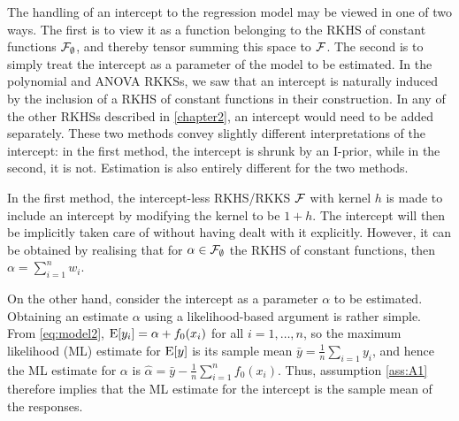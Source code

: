 The handling of an intercept to the regression model may be viewed in one of two ways.
The first is to view it as a function belonging to the RKHS of constant functions ${\mathcal F}_\emptyset$, and thereby tensor summing this space to ${\mathcal F}$.
The second is to simply treat the intercept as a parameter of the model to be estimated.
In the polynomial and ANOVA RKKSs, we saw that an intercept is naturally induced by the inclusion of a RKHS of constant functions in their construction.
In any of the other RKHSs described in \cref{chapter2}, an intercept would need to be added separately.
These two methods convey slightly different interpretations of the intercept: in the first method, the intercept is shrunk by an I-prior, while in the second, it is not.
Estimation is also entirely different for the two methods.

In the first method, the intercept-less RKHS/RKKS ${\mathcal F}$ with kernel $h$ is made to include an intercept by modifying the kernel to be $1 + h$.
The intercept will then be implicitly taken care of without having dealt with it explicitly.
However, it can be obtained by realising that for $\alpha\in{\mathcal F}_\emptyset$ the RKHS of constant functions, then $\alpha = \sum_{i=1}^n w_i$.

On the other hand, consider the intercept as a parameter $\alpha$ to be estimated.
Obtaining an estimate $\alpha$ using a likelihood-based argument is rather simple.
From \cref{eq:model2}, $\operatorname{E} [y_i] = \alpha + f_0(x_i)$ for all $i=1,\dots,n$, so the maximum likelihood (ML) estimate for $\operatorname{E}[y]$ is its sample mean $\bar y = \frac{1}{n}\sum_{i=1} y_i$, and hence the ML estimate for $\alpha$ is $\hat\alpha = \bar y - \frac{1}{n} \sum_{i=1}^n f_0(x_i)$.
Thus, assumption \ref{ass:A1} therefore implies that the ML estimate for the intercept is the sample mean of the responses.


